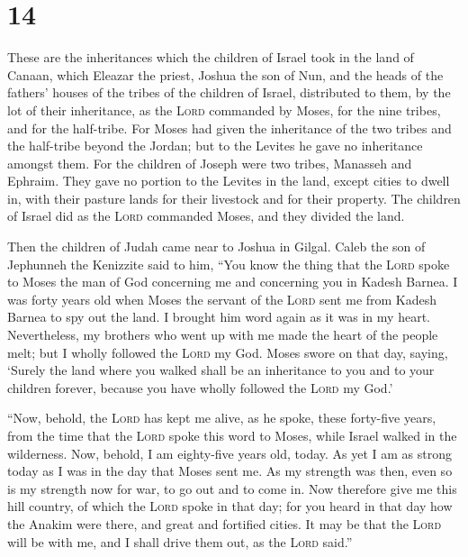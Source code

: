 \hypertarget{section-13}{%
\section{14}\label{section-13}}

 These are the inheritances which the children of Israel
took in the land of Canaan, which Eleazar the priest, Joshua the son of
Nun, and the heads of the fathers' houses of the tribes of the children
of Israel, distributed to them,  by the lot of their
inheritance, as the \textsc{Lord} commanded by Moses, for the nine
tribes, and for the half-tribe.  For Moses had given the
inheritance of the two tribes and the half-tribe beyond the Jordan; but
to the Levites he gave no inheritance amongst them.  For
the children of Joseph were two tribes, Manasseh and Ephraim. They gave
no portion to the Levites in the land, except cities to dwell in, with
their pasture lands for their livestock and for their property.
 The children of Israel did as the \textsc{Lord} commanded
Moses, and they divided the land.

 Then the children of Judah came near to Joshua in Gilgal.
Caleb the son of Jephunneh the Kenizzite said to him, ``You know the
thing that the \textsc{Lord} spoke to Moses the man of God concerning me
and concerning you in Kadesh Barnea.  I was forty years
old when Moses the servant of the \textsc{Lord} sent me from Kadesh
Barnea to spy out the land. I brought him word again as it was in my
heart.  Nevertheless, my brothers who went up with me made
the heart of the people melt; but I wholly followed the \textsc{Lord} my
God.  Moses swore on that day, saying, `Surely the land
where you walked shall be an inheritance to you and to your children
forever, because you have wholly followed the \textsc{Lord} my God.'

 ``Now, behold, the \textsc{Lord} has kept me alive, as
he spoke, these forty-five years, from the time that the \textsc{Lord}
spoke this word to Moses, while Israel walked in the wilderness. Now,
behold, I am eighty-five years old, today.  As yet I am
as strong today as I was in the day that Moses sent me. As my strength
was then, even so is my strength now for war, to go out and to come in.
 Now therefore give me this hill country, of which the
\textsc{Lord} spoke in that day; for you heard in that day how the
Anakim were there, and great and fortified cities. It may be that the
\textsc{Lord} will be with me, and I shall drive them out, as the
\textsc{Lord} said.''

